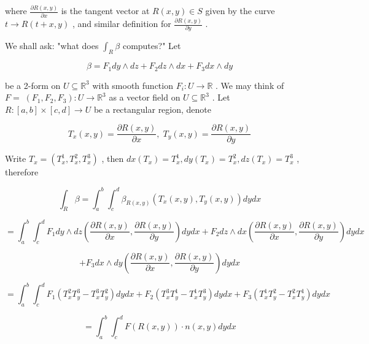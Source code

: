 \documentclass[lang=cn,a4paper,11pt,openany,twoside]{elegantbook}
\begin{document}
where \(\frac{\partial R\left( {x,y}\right) }{\partial x}\) is the tangent vector at \(R\left( {x,y}\right)  \in  S\) given by the curve \(t \rightarrow  R\left( {t + x,y}\right)\) , and similar definition for \(\frac{\partial R\left( {x,y}\right) }{\partial y}\) .

We shall ask: "what does \({\int }_{R}\beta\) computes?" Let

\[
\beta  = {F}_{1}{dy} \land  {dz} + {F}_{2}{dz} \land  {dx} + {F}_{3}{dx} \land  {dy}
\]

be a 2-form on \(U \subseteq  {\mathbb{R}}^{3}\) with smooth function \({F}_{i} : U \rightarrow  \mathbb{R}\) . We may think of \(F = \; \left( {{F}_{1},{F}_{2},{F}_{3}}\right)  : U \rightarrow  {\mathbb{R}}^{3}\) as a vector field on \(U \subseteq  {\mathbb{R}}^{3}\) . Let \(R : \left\lbrack  {a,b}\right\rbrack   \times  \left\lbrack  {c,d}\right\rbrack   \rightarrow  U\) be a rectangular region, denote

\[
{T}_{x}\left( {x,y}\right)  = \frac{\partial R\left( {x,y}\right) }{\partial x},\;{T}_{y}\left( {x,y}\right)  = \frac{\partial R\left( {x,y}\right) }{\partial y}
\]

Write \({T}_{x} = \left( {{T}_{x}^{1},{T}_{x}^{2},{T}_{x}^{3}}\right)\) , then \({dx}\left( {T}_{x}\right)  = {T}_{x}^{1},{dy}\left( {T}_{x}\right)  = {T}_{x}^{2},{dz}\left( {T}_{x}\right)  = {T}_{x}^{3}\) , therefore

\[
{\int }_{R}\beta  = {\int }_{a}^{b}{\int }_{c}^{d}{\beta }_{R\left( {x,y}\right) }\left( {{T}_{x}\left( {x,y}\right) ,{T}_{y}\left( {x,y}\right) }\right) {dydx}
\]

\[
= {\int }_{a}^{b}{\int }_{c}^{d}{F}_{1}{dy} \land  {dz}\left( {\frac{\partial R\left( {x,y}\right) }{\partial x},\frac{\partial R\left( {x,y}\right) }{\partial y}}\right) {dydx} + {F}_{2}{dz} \land  {dx}\left( {\frac{\partial R\left( {x,y}\right) }{\partial x},\frac{\partial R\left( {x,y}\right) }{\partial y}}\right) {dydx}
\]

\[
+ {F}_{3}{dx} \land  {dy}\left( {\frac{\partial R\left( {x,y}\right) }{\partial x},\frac{\partial R\left( {x,y}\right) }{\partial y}}\right) {dydx}
\]

\[
= {\int }_{a}^{b}{\int }_{c}^{d}{F}_{1}\left( {{T}_{x}^{2}{T}_{y}^{3} - {T}_{x}^{3}{T}_{y}^{2}}\right) {dydx} + {F}_{2}\left( {{T}_{x}^{3}{T}_{y}^{1} - {T}_{x}^{1}{T}_{y}^{3}}\right) {dydx} + {F}_{3}\left( {{T}_{x}^{1}{T}_{y}^{2} - {T}_{x}^{2}{T}_{y}^{1}}\right) {dydx}
\]

\[
= {\int }_{a}^{b}{\int }_{c}^{d}F\left( {R\left( {x,y}\right) }\right)  \cdot  n\left( {x,y}\right) {dydx}
\]
\end{document}
